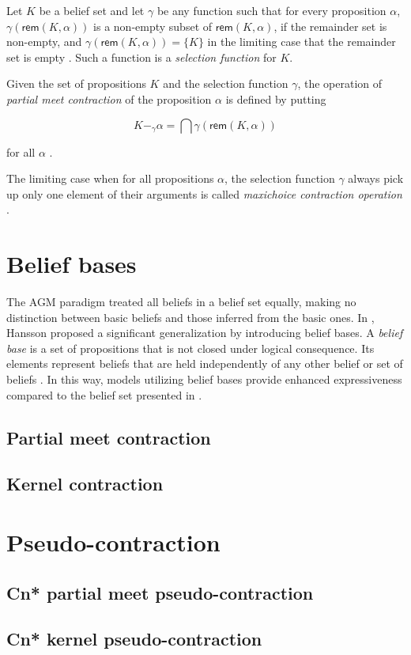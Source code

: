\begin{definition}
    Let $K$ be a belief set and let $\gamma$ be any function such that for every proposition $\alpha$, $\gamma(\textsf{rem}(K, \alpha))$ is a non-empty subset of $\textsf{rem}(K, \alpha)$, if the remainder set is non-empty, and $\gamma(\textsf{rem}(K, \alpha)) = \{ K \}$ in the limiting case that the remainder set is empty \citep{AGM1985}. Such a function is a \textit{selection function} for $K$.
\end{definition}

\begin{definition}
    Given the set of propositions $K$ and the selection function $\gamma$, the operation of \textit{partial meet contraction} of the proposition $\alpha$ is defined by putting

    $$K -_{\gamma} \alpha = \bigcap \gamma(\textsf{rem}(K, \alpha))$$

    for all $\alpha$ \citep{AGM1985}.
\end{definition}

\begin{definition}
    The limiting case when for all propositions $\alpha$, the selection function $\gamma$ always pick up only one element of their arguments is called \textit{maxichoice contraction operation} \citep{AGM1985}.
\end{definition}

\section{Belief bases}

The AGM paradigm treated all beliefs in a belief set equally, making no distinction between basic beliefs and those inferred from the basic ones. In \citet{Hansson1993}, Hansson proposed a significant generalization by introducing belief bases. A \textit{belief base} is a set of propositions that is not closed under logical consequence. Its elements represent beliefs that are held independently of any other belief or set of beliefs \citep{Hansson2022}. In this way, models utilizing belief bases provide enhanced expressiveness compared to the belief set presented in \citet{AGM1985}.

\subsection{Partial meet contraction}
\subsection{Kernel contraction}

\section{Pseudo-contraction}
\subsection{Cn* partial meet pseudo-contraction}
\subsection{Cn* kernel pseudo-contraction}
